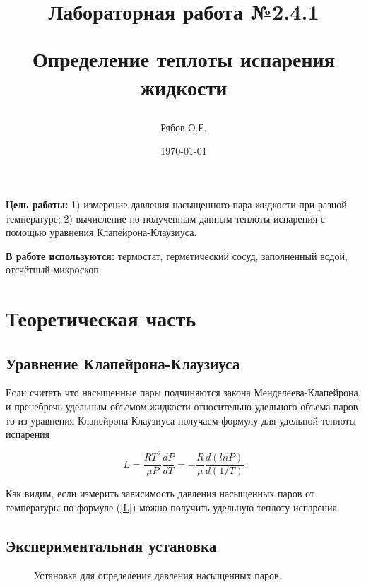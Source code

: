 \documentclass[a4paper, 12pt]{article}
\title{\begin{center}Лабораторная работа №2.4.1\end{center}
Определение теплоты испарения жидкости}
\author{Рябов О.Е.}
\date{\today}
\begin{document}
    \maketitle
    \newpage


    \textbf{Цель работы:} 1) измерение давления насыщенного пара жидкости при разной температуре; 2) вычисление по полученным данным теплоты испарения с помощью уравнения Клапейрона-Клаузиуса.

    \textbf{В работе используются:} термостат, герметический сосуд, заполненный водой, отсчётный микроскоп.


    \section{Теоретическая часть}
    \subsection{Уравнение Клапейрона-Клаузиуса}
    Если считать что насыщенные пары подчиняются закона Менделеева-Клапейрона, и пренебречь удельным объемом жидкости относительно удельного объема паров то из уравнения Клапейрона-Клаузиуса получаем формулу для удельной теплоты испарения

    \begin{equation}\label{L}
        L = \frac{RT^2}{\mu P}\frac{dP}{dT} = - \frac{R}{\mu} \frac{d(ln P)}{d(1/T)}
    \end{equation}

    Как видим, если измерить зависимость давления насыщенных паров от температуры по формуле (\ref{L}) можно получить удельную теплоту испарения.
    \subsection{Экспериментальная установка}
    \begin{figure}[h]
        \caption{Установка для определения давления насыщенных паров.}
        \label{ustanovka}
    \end{figure}
\end{document}
